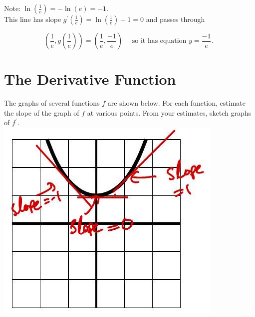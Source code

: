 \documentclass[10pt]{article}
\begin{document}
Note: $\ln \left(\frac{1}{e}\right)=-\ln (e)=-1$.\\
This line has slope $g^{\prime}\left(\frac{1}{e}\right)=\ln \left(\frac{1}{e}\right)+1=0$ and passes through

$$
\left(\frac{1}{e}, g\left(\frac{1}{e}\right)\right)=\left(\frac{1}{e}, \frac{-1}{e}\right) \quad \text { so it has equation } y=\frac{-1}{e} \text {. }
$$

\section*{The Derivative Function}
The graphs of several functions $f$ are shown below. For each function, estimate the slope of the graph of $f$ at various points. From your estimates, sketch graphs of $f^{\prime}$.\\
\includegraphics[max width=\textwidth, center]{2024_12_26_646789e1ccd1e87aeca8g-07(1)}
\end{document}
